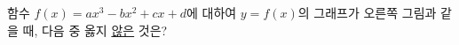 \noindent\begin{minipage}[t]{0.58\linewidth}\vspace{0pt}\raggedright 함수 $f(x)=ax^3-bx^2+cx+d$에 대하여 $y=f(x)$의 그래프가 오른쪽 그림과 같을 때, 다음 중 옳지 \underline{않은} 것은? \end{minipage}\hfill\begin{minipage}[t]{0.4\linewidth}\vspace{0pt}\centering \resizebox{\ifdim\width>\linewidth\linewidth\else\width\fi}{!}{}\end{minipage}\par
{}

